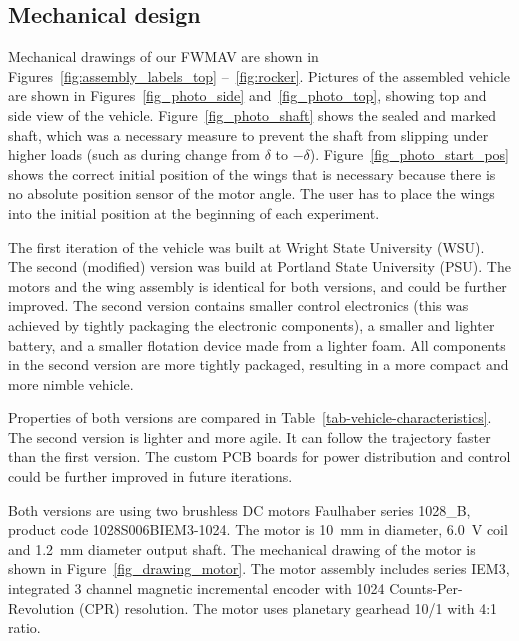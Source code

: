\cleardoublepage
\def\appendixname{Appendix}
\begin{appendix}
\captionsetup{list=no}
\updatechaptername

\chapter{Mechanical design}
\label{a:mechanical-design}

Mechanical drawings of our FWMAV are shown in Figures~\ref{fig:assembly_labels_top} --~\ref{fig:rocker}. Pictures of the assembled vehicle are shown in Figures~\ref{fig_photo_side} and~\ref{fig_photo_top}, showing top and side view of the vehicle. Figure~\ref{fig_photo_shaft} shows the sealed and marked shaft, which was a necessary measure to prevent the shaft from slipping under higher loads (such as during change from $\delta$ to $-\delta$). Figure~\ref{fig_photo_start_pos} shows the correct initial position of the wings that is necessary because there is no absolute position sensor of the motor angle. The user has to place the wings into the initial position at the beginning of each experiment.

The first iteration of the vehicle was built at Wright State University (WSU). The second (modified) version was build at Portland State University (PSU). The motors and the wing assembly is identical for both versions, and could be further improved. The second version contains smaller control electronics (this was achieved by tightly packaging the electronic components), a smaller and lighter battery, and a smaller flotation device made from a lighter foam. All components in the second version are more tightly packaged, resulting in a more compact and more nimble vehicle.

Properties of both versions are compared in Table~\ref{tab-vehicle-characteristics}. The second version is lighter and more agile. It can follow the trajectory faster than the first version. The custom PCB boards for power distribution and control could be further improved in future iterations.

Both versions are using two brushless DC motors Faulhaber series 1028\_B, product code 1028S006BIEM3-1024. The motor is 10~mm in diameter, 6.0~V coil and 1.2~mm diameter output shaft. The mechanical drawing of the motor is shown in Figure~\ref{fig_drawing_motor}. The motor assembly includes series IEM3, integrated 3 channel magnetic incremental encoder with 1024 Counts-Per-Revolution (CPR) resolution. The motor uses planetary gearhead 10/1 with 4:1 ratio.


\end{appendix}
